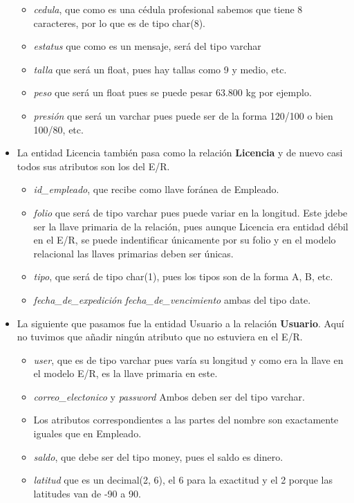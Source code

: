 \documentclass[11pt]{article}
\begin{document}
\begin{itemize}
\begin{itemize}
    \item \textit{cedula}, que como es una cédula profesional sabemos que tiene 8 caracteres, por lo que es de tipo char(8).
    \item \textit{estatus} que como es un mensaje, será del tipo varchar
    \item \textit{talla} que será un float, pues hay tallas como 9 y medio, etc.
    \item \textit{peso} que será un float pues se puede pesar 63.800 kg por ejemplo.
    \item \textit{presión} que será un varchar pues puede ser de la forma 120/100 o bien 100/80, etc. 
    \end{itemize}
\item La entidad Licencia también pasa como la relación \textbf{Licencia} y de nuevo casi todos sus atributos son los del E/R.
    \begin{itemize}
    \item \textit{id\_empleado}, que recibe como llave foránea de Empleado.
    \item \textit{folio} que será de tipo varchar pues puede variar en la longitud. Este jdebe ser la llave primaria de la relación, pues aunque Licencia era entidad débil en el E/R, se puede indentificar únicamente por su folio y en el modelo relacional las llaves primarias deben ser únicas.
    \item \textit{tipo}, que será de tipo char(1), pues los tipos son de la forma A, B, etc.
    \item \textit{fecha\_de\_expedición} \textit{fecha\_de\_vencimiento} ambas del tipo date.
    \end{itemize}   
\item La siguiente que pasamos fue la entidad Usuario a la relación \textbf{Usuario}. Aquí no tuvimos que añadir ningún atributo que no estuviera en el E/R.
    \begin{itemize}
    \item \textit{user}, que es de tipo varchar pues varía su longitud y como era la llave en el modelo E/R, es la llave primaria en este. 
    \item \textit{correo\_electonico} y \textit{password} Ambos deben ser del tipo varchar. 
    \item Los atributos correspondientes a las partes del nombre son exactamente iguales que en Empleado. 
    \item \textit{saldo}, que debe ser del tipo money, pues el saldo es dinero.
    \item \textit{latitud} que es un decimal(2, 6), el 6 para la exactitud y el 2 porque las latitudes van de -90 a 90.

\end{itemize}
\end{itemize}
\end{document}
